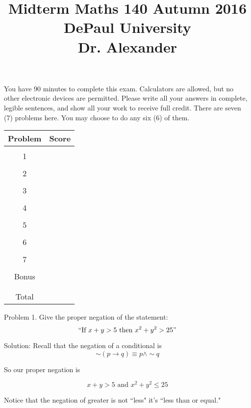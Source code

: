 \documentclass[16 pt]{amsart}
\theoremstyle{definition}
\theoremstyle{remark}
\numberwithin{equation}{subsection}
\begin{document}
\title{Midterm Maths 140 Autumn 2016 \\ DePaul University\\Dr. Alexander}
\maketitle
You have 90 minutes to complete this exam.  Calculators are allowed, but no other electronic devices are permitted.  Please write all your answers in complete, legible sentences, and show all your work to receive full credit.  There are seven (7) problems here.  You may choose to do any six (6) of them.  
\vspace{1in}


\begin{center}
  \begin{tabular}{ c | c }
    Problem & Score\\
    \hline
    &\\
    1&\\
    &\\
    2&\\
    &\\
    3&\\
    &\\
    4&\\
    &\\
    5&\\
    &\\
    6&\\
    &\\
    7&\\
    &\\
    Bonus&\\
    &\\
    \hline 
    &\\    
    Total& 
 \end{tabular}
\end{center}

\newpage 
Problem 1. Give the proper negation of the statement:
\[
\text{``If } x+y > 5 \text{ then } x^2+y^2 > 25"
\]

\vspace{1in}

Solution: Recall that the negation of a conditional is
\[
\sim(p\rightarrow q) \equiv p\wedge \sim q
\]

So our proper negation is

\[
x+y>5 \text{ and } x^2+y^2 \le 25
\]

Notice that the negation of greater is not ``less" it's ``less than or equal."
\end{document}
